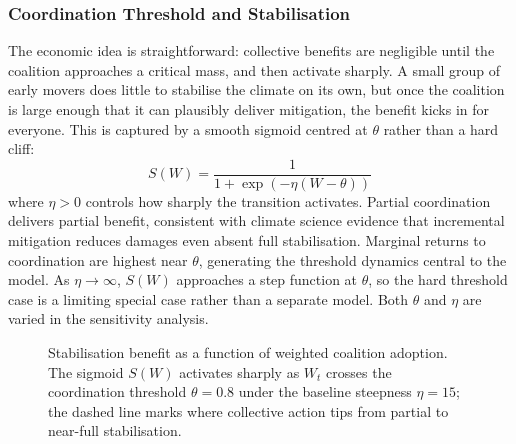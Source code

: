 \documentclass[10pt,a4paper]{article}
\begin{document}
\needspace{12em}
\subsubsection*{Coordination Threshold and Stabilisation}

The economic idea is straightforward: collective benefits are negligible until the coalition
approaches a critical mass, and then activate sharply. A small group of early movers does little
to stabilise the climate on its own, but once the coalition is large enough that it can plausibly
deliver mitigation, the benefit kicks in for everyone. This is captured by a smooth sigmoid
centred at $\theta$ rather than a hard cliff:
\[
S(W) = \frac{1}{1 + \exp(-\eta(W - \theta))}
\]
where $\eta > 0$ controls how sharply the transition activates. Partial coordination delivers partial
benefit, consistent with climate science evidence that incremental mitigation reduces damages
even absent full stabilisation. Marginal returns to coordination are highest near $\theta$,
generating the threshold dynamics central to the model. As $\eta \to \infty$, $S(W)$ approaches
a step function at $\theta$, so the hard threshold case is a limiting special case rather than a
separate model. Both $\theta$ and $\eta$ are varied in the sensitivity analysis.

\begin{figure}[htbp]
\centering
{}
\caption{Stabilisation benefit as a function of weighted coalition adoption. The sigmoid $S(W)$
activates sharply as $W_t$ crosses the coordination threshold $\theta = 0.8$ under the baseline
steepness $\eta = 15$; the dashed line marks where collective action tips from partial to
near-full stabilisation.}
\label{fig:state_viz}
\end{figure}
\end{document}
